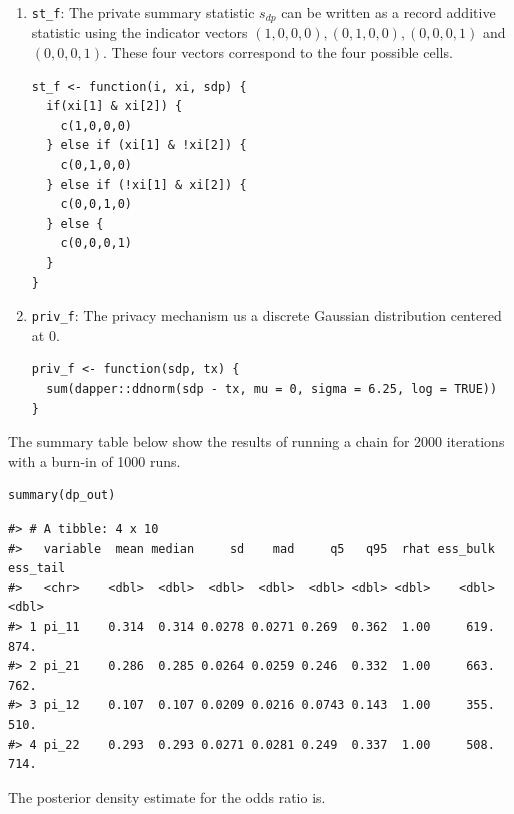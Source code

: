 \begin{enumerate}
\def\labelenumi{\arabic{enumi}.}
\item
  \texttt{st\_f}: The private summary statistic \(s_{dp}\) can be written as a record additive
  statistic using the indicator vectors \((1,0,0,0), (0,1,0,0), (0,0,0,1)\) and \((0,0,0,1)\).
  These four vectors correspond to the four possible cells.

\begin{verbatim}
st_f <- function(i, xi, sdp) {
  if(xi[1] & xi[2]) {
    c(1,0,0,0)
  } else if (xi[1] & !xi[2]) {
    c(0,1,0,0)
  } else if (!xi[1] & xi[2]) {
    c(0,0,1,0)
  } else {
    c(0,0,0,1)
  }
}
\end{verbatim}
\item
  \texttt{priv\_f}: The privacy mechanism us a discrete Gaussian distribution centered
  at 0.

\begin{verbatim}
priv_f <- function(sdp, tx) {
  sum(dapper::ddnorm(sdp - tx, mu = 0, sigma = 6.25, log = TRUE))
}
\end{verbatim}
\end{enumerate}

The summary table below show the results of running a chain for 2000 iterations with a burn-in of 1000 runs.

\begin{verbatim}
summary(dp_out)
\end{verbatim}

\begin{verbatim}
#> # A tibble: 4 x 10
#>   variable  mean median     sd    mad     q5   q95  rhat ess_bulk ess_tail
#>   <chr>    <dbl>  <dbl>  <dbl>  <dbl>  <dbl> <dbl> <dbl>    <dbl>    <dbl>
#> 1 pi_11    0.314  0.314 0.0278 0.0271 0.269  0.362  1.00     619.     874.
#> 2 pi_21    0.286  0.285 0.0264 0.0259 0.246  0.332  1.00     663.     762.
#> 3 pi_12    0.107  0.107 0.0209 0.0216 0.0743 0.143  1.00     355.     510.
#> 4 pi_22    0.293  0.293 0.0271 0.0281 0.249  0.337  1.00     508.     714.
\end{verbatim}

The posterior density estimate for the odds ratio is.

